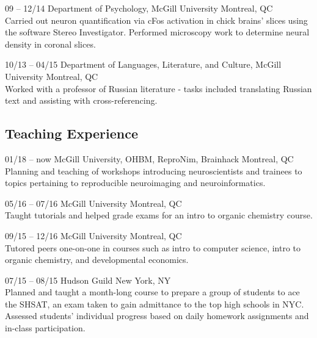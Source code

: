 \documentclass[]{friggeri-cv} %
\begin{document}
\clearpage


\begin{entrylist}
\entry
{09 -- 12/14}
{Department of Psychology, McGill University}
{Montreal, QC}
{\\
Carried out neuron quantification via cFos activation
in chick brains' slices using the software Stereo Investigator.
Performed microscopy work to determine neural density in 
coronal slices.
}

\entry
{10/13 -- 04/15}
{Department of Languages, Literature, and Culture, McGill University}
{Montreal, QC}
{\\
Worked with a professor of Russian literature - tasks included translating Russian text and 
assisting with cross-referencing. 
}
\end{entrylist}

\subsection{Teaching Experience}

\begin{entrylist}
\entry
{01/18 -- now}
{McGill University, OHBM, ReproNim, Brainhack}
{Montreal, QC}
{ \\
Planning and teaching of workshops introducing neuroscientists and trainees to
topics pertaining to reproducible neuroimaging and neuroinformatics.}

\entry
{05/16 -- 07/16}
{McGill University}
{Montreal, QC}
{ \\
Taught tutorials and helped grade exams for an intro to organic chemistry course.
}

\entry
{09/15 -- 12/16}
{McGill University}
{Montreal, QC}
{ \\
Tutored peers one-on-one in courses such as intro to computer science, intro to organic chemistry,
and developmental economics.
}

\entry
{07/15 -- 08/15}
{Hudson Guild}
{New York, NY}
{ \\
Planned and taught a month-long course to prepare a group of students to ace the SHSAT, 
an exam taken to gain admittance to the top high schools in NYC. Assessed students'
individual progress based on daily homework assignments and in-class participation.}

\end{entrylist}
\end{document}
